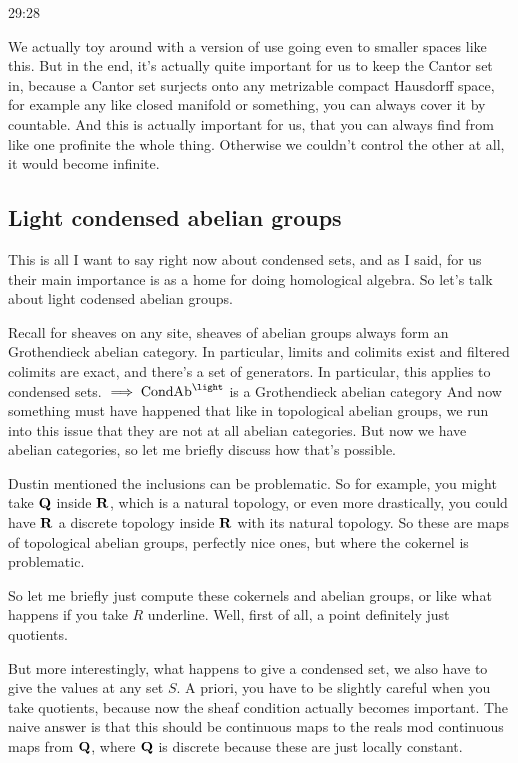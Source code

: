 \begin{example}
\begin{unfinished}{29:28}
\begin{remark}
\begin{remark}
We actually toy around with a version of use going even to smaller spaces like this. But in the end, it's actually quite important for us to keep the Cantor set in, because a Cantor set surjects onto any metrizable compact Hausdorff space, for example any like closed manifold or something, you can always cover it by countable. And this is actually important for us, that you can always find from like one profinite the whole thing. Otherwise we couldn't control the other at all, it would become infinite.

\subsection{Light condensed abelian groups} \label{subsec:light_condensed_abelian_groups}

This is all I want to say right now about condensed sets, and as I said, for us their main importance is as a home for doing homological algebra. So let's talk about light codensed abelian groups.

Recall for sheaves on any site, sheaves of abelian groups always form an Grothendieck abelian category. In particular, limits and colimits exist and filtered colimits are exact, and there's a set of generators. 
In particular, this applies to condensed sets.
$\implies \Cond\Ab^\light$ is a Grothendieck abelian category
And now something must have happened that like in topological abelian groups, we run into this issue that they are not at all abelian categories. But now we have abelian categories, so let me briefly discuss how that's possible.

\begin{example}


Dustin mentioned the inclusions can be problematic. So for example, you might take $\mathbf Q$ inside $\mathbf R$, which is a natural topology, or even more drastically, you could have $\mathbf R$ a discrete topology inside $\mathbf R$ with its natural topology. So these are maps of topological abelian groups, perfectly nice ones, but where the cokernel is problematic.

So let me briefly just compute these cokernels and abelian groups, 
or like what happens if you take $R$ underline. Well, first of all, a point definitely just quotients.

But more interestingly, what happens to give a condensed set, we also have to give the values at any set $S$. A priori, you have to be slightly careful when you take quotients, because now the sheaf condition actually becomes important. The naive answer is that this should be continuous maps to the reals mod continuous maps from $\mathbf Q$, where $\mathbf Q$ is discrete because these are just locally constant.


\end{example}
\end{remark}
\end{remark}
\end{unfinished}
\end{example}
